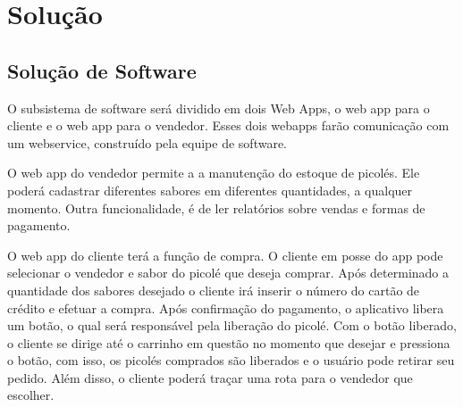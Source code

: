 \chapter{Solução}

\section{Solução de Software}

O subsistema de software será dividido em dois Web Apps, o web app para o cliente e o web app para o vendedor. Esses dois webapps farão comunicação com um webservice, construído pela equipe de software.

	O web app do vendedor permite a a manutenção do estoque de picolés. Ele poderá cadastrar diferentes sabores em diferentes quantidades, a qualquer momento. 
    Outra funcionalidade, é de ler relatórios sobre vendas e formas de pagamento.
    
    O web app do cliente terá a função de compra. O cliente em posse do app pode selecionar o vendedor e sabor do picolé que deseja comprar. Após determinado a quantidade dos sabores desejado o cliente irá inserir o número do cartão de crédito e efetuar a compra. Após confirmação do pagamento, o aplicativo libera um botão, o qual será responsável pela liberação do picolé. Com o botão liberado, o cliente se dirige até o carrinho em questão no momento que desejar e pressiona o botão, com isso, os picolés comprados são liberados e o usuário pode retirar seu pedido. Além disso, o cliente poderá traçar uma rota para o vendedor que escolher.

